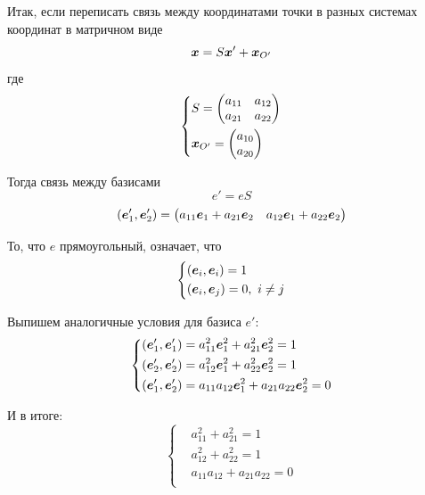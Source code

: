 \documentclass[a4paper,12pt]{article}
\begin{document}
  \begin{solution}
    Итак, если переписать связь между координатами точки в разных системах координат в матричном виде
    \[
      \boldsymbol x = S \boldsymbol x' + \boldsymbol x_{O'}
    \]
    где
    \[
      \left\{
        \begin{aligned}
          &S = \begin{pmatrix}
              a_{11} & a_{12}\\
              a_{21} & a_{22}
            \end{pmatrix}\\
          &\boldsymbol x_{O'} = \begin{pmatrix}
              a_{10}\\ a_{20}
            \end{pmatrix}
        \end{aligned}
      \right.
    \]
    
    Тогда связь между базисами
    \[
      e' = e S
    \]
    \[
      (\boldsymbol e_1', \boldsymbol e_2') = \begin{pmatrix}
        a_{11} \boldsymbol e_1 + a_{21} \boldsymbol e_2
        & a_{12} \boldsymbol e_1 + a_{22} \boldsymbol e_2
      \end{pmatrix}
    \]
    
    То, что $e$ прямоугольный, означает, что
    \[
      \left\{
        \begin{aligned}
          &(\boldsymbol e_i, \boldsymbol e_i) = 1\\
          &(\boldsymbol e_i, \boldsymbol e_j) = 0,\ i \not= j
        \end{aligned}
      \right.
    \]
    
    Выпишем аналогичные условия для базиса $e'$:
    \[
      \left\{
        \begin{aligned}
          &(\boldsymbol e_1', \boldsymbol e_1') = a_{11}^2 \boldsymbol e_1^2 + a_{21}^2 \boldsymbol e_2^2 = 1\\
          &(\boldsymbol e_2', \boldsymbol e_2') = a_{12}^2 \boldsymbol e_1^2 + a_{22}^2 \boldsymbol e_2^2 = 1\\
          &(\boldsymbol e_1', \boldsymbol e_2') = a_{11} a_{12} \boldsymbol e_1^2 + a_{21} a_{22} \boldsymbol e_2^2 = 0
        \end{aligned}
      \right.
    \]
    
    И в итоге:
    \[
      \left\{
        \begin{aligned}
          &a_{11}^2 + a_{21}^2 = 1\\
          &a_{12}^2 + a_{22}^2 = 1\\
          &a_{11} a_{12} + a_{21} a_{22} = 0\\
        \end{aligned}
      \right.
    \]
    

\end{solution}
\end{document}
